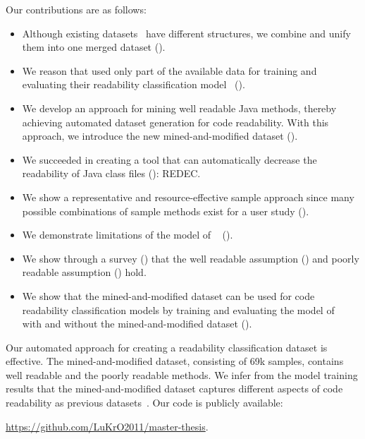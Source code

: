 \documentclass[%
class=scrreprt,
chapterprefix=false,%
open=right,%
twoside=true,%
paper=a4,%
logofile={Logo\_zentral\_farbig\_EN.png},%
thesistype=master,%
UKenglish,%
]{se2thesis}
\theoremstyle{definition}
\newcommand{\citeolddataset}{\cite{buse2009learning, dorn2012general, scalabrino2018comprehensive}\xspace}
\newcommand{\numSamples}{69k\xspace}
\newcommand{\rdh}{REDEC\xspace}
\begin{document}
	Our contributions are as follows:
	\begin{itemize}
		\item Although existing datasets~\citeolddataset have different structures, we combine and unify them into one merged dataset ().
		\item We reason that \citeauthor{mi2022towards} used only part of the available data for training and evaluating their readability classification model~\cite{mi2022towards} ().
		\item We develop an approach for mining well readable Java methods, thereby achieving automated dataset generation for code readability. With this approach, we introduce the new mined-and-modified dataset ().
		\item We succeeded in creating a tool that can automatically decrease the readability of Java class files (): \rdh.
		\item We show a representative and resource-effective sample approach since many possible combinations of sample methods exist for a user study ().
		\item We demonstrate limitations of the model of \citeauthor{mi2022towards}~\cite{mi2022towards} ().
		\item We show through a survey () that the well readable assumption () and poorly readable assumption () hold.
		\item We show that the mined-and-modified dataset can be used for code readability classification models by training and evaluating the model of \citeauthor{mi2022towards}~\cite{mi2022towards} with and without the mined-and-modified dataset ().
	\end{itemize}
	
	Our automated approach for creating a readability classification dataset is effective. The mined-and-modified dataset, consisting of \numSamples samples, contains well readable and the poorly readable methods.
	We infer from the model training results that the mined-and-modified dataset captures different aspects of code readability as previous datasets~\citeolddataset.
	Our code is publicly available:
	\begin{center}
		\textcolor{blue}{\url{https://github.com/LuKrO2011/master-thesis}}.
	\end{center}
			
\end{document}
